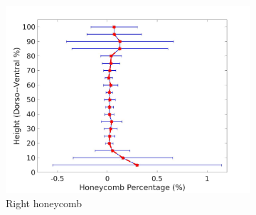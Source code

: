 \begin{figure}[H]
\begin{subfigure}{.42\linewidth}
  \includegraphics[width=\linewidth,trim={{.0\wd0} {.0\wd0} {.0\wd0} {.0\wd0}},clip]{QuantitativeAnalysis/Image/RightLungHoneycombDiseaseDorsoToVentral.jpg}
  \caption{Right honeycomb}
  \label{fig:DiseaseDorsoToVentral-f}
\end{subfigure}
\begin{subfigure}{.42\linewidth}%

\end{subfigure}
\end{figure}
